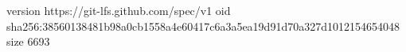 version https://git-lfs.github.com/spec/v1
oid sha256:38560138481b98a0cb1558a4e60417c6a3a5ea19d91d70a327d1012154654048
size 6693
